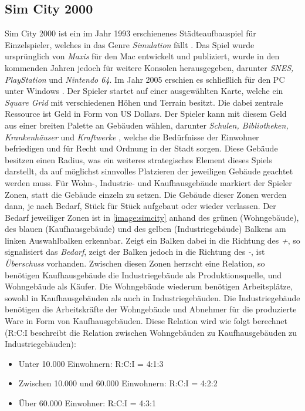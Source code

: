 \subsection{Sim City 2000}
Sim City 2000 ist ein im Jahr 1993 erschienenes Städteaufbauspiel für Einzelspieler, welches in das Genre \textit{Simulation} fällt \cite{simcity:ea}. Das Spiel wurde ursprünglich von \textit{Maxis} für den Mac entwickelt und publiziert, wurde in den kommenden Jahren jedoch für weitere Konsolen herausgegeben, darunter \textit{SNES, PlayStation} und \textit{Nintendo 64}. Im Jahr 2005 erschien es schließlich für den PC unter Windows \cite{simcity:igdb}. Der Spieler startet auf einer ausgewählten Karte, welche ein \textit{Square Grid} mit verschiedenen Höhen und Terrain besitzt. Die dabei zentrale Ressource ist Geld in Form von US Dollars. Der Spieler kann mit diesem Geld aus einer breiten Palette an Gebäuden wählen, darunter \textit{Schulen, Bibliotheken, Krankenhäuser} und \textit{Kraftwerke} \cite*[]{simcity:igdb}, welche die Bedürfnisse der Einwohner befriedigen und für Recht und Ordnung in der Stadt sorgen. Diese Gebäude besitzen einen Radius, was ein weiteres strategisches Element dieses Spiels darstellt, da auf möglichst sinnvolles Platzieren der jeweiligen Gebäude geachtet werden muss. Für Wohn-, Industrie- und Kaufhausgebäude markiert der Spieler Zonen, statt die Gebäude einzeln zu setzen. Die Gebäude dieser Zonen werden dann, je nach Bedarf, Stück für Stück aufgebaut oder wieder verlassen. Der Bedarf jeweiliger Zonen ist in \autoref{image:simcity} anhand des grünen (Wohngebäude), des blauen (Kaufhausgebäude) und des gelben (Industriegebäude) Balkens am linken Auswahlbalken erkennbar. Zeigt ein Balken dabei in die Richtung des \textit{+}, so signalisiert das \textit{Bedarf}, zeigt der Balken jedoch in die Richtung des \textit{-}, ist \textit{Überschuss} vorhanden. Zwischen diesen Zonen herrscht eine Relation, so benötigen Kaufhausgebäude die Industriegebäude als Produktionsquelle, und Wohngebäude als Käufer. Die Wohngebäude wiederum benötigen Arbeitsplätze, sowohl in Kaufhausgebäuden als auch in Industriegebäuden. Die Industriegebäude benötigen die Arbeitskräfte der Wohngebäude und Abnehmer für die produzierte Ware in Form von Kaufhausgebäuden. Diese Relation wird wie folgt berechnet (R:C:I beschreibt die Relation zwischen Wohngebäuden zu Kaufhausgebäuden zu Industriegebäuden): 
\newpage
\begin{itemize}
    \item Unter 10.000 Einwohnern: R:C:I = 4:1:3
    \item Zwischen 10.000 und 60.000 Einwohnern: R:C:I = 4:2:2
    \item Über 60.000 Einwohner: R:C:I = 4:3:1 \cite*[]{simcity:somacon}
\end{itemize}
